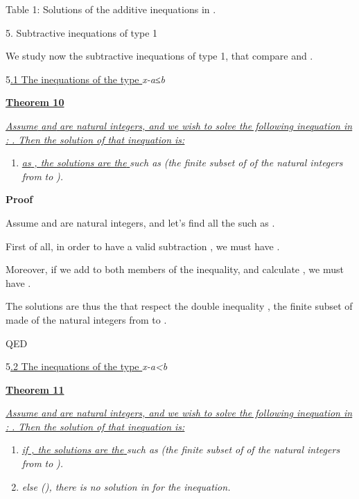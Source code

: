 \documentclass{article}
\providecommand{\tightlist}{%
  \setlength{\itemsep}{0pt}\setlength{\parskip}{0pt}}
\begin{document}
Table 1: Solutions of the additive inequations in .





5. Subtractive inequations of type 1

We study now the subtractive inequations of type 1, that compare  and .

5\ul{.1 The inequations of the type }\emph{x-a}\emph{≤}\emph{b}

\ul{\textbf{Theorem 10}}

\ul{\emph{Assume }}\ul{\emph{ and }}\ul{\emph{ are natural integers, and we wish to solve the following inequation in }}\ul{\emph{: }}\ul{\emph{. Then the solution of that inequation is:}}

\begin{enumerate}
\tightlist
\item \ul{\emph{as }}\ul{\emph{, the solutions are the }}\emph{ such as }\emph{ (the finite subset of }\emph{ of the natural integers from }\emph{ to }\emph{).}
\end{enumerate}

\textbf{Proof}

Assume  and  are natural integers, and let’s find all the  such as .

First of all, in order to have a valid subtraction , we must have .

Moreover, if we add  to both members of the inequality, and calculate , we must have .

The solutions are thus the  that respect the double inequality , the finite subset of  made of the natural integers from  to .

QED

5\ul{.2 The inequations of the type }\emph{x-a<b}

\ul{\textbf{Theorem 11}}

\ul{\emph{Assume }}\ul{\emph{ and }}\ul{\emph{ are natural integers, and we wish to solve the following inequation in }}\ul{\emph{: }}\ul{\emph{. Then the solution of that inequation is:}}

\begin{enumerate}
\tightlist
\item \ul{\emph{if }}\ul{\emph{, the solutions are the }}\emph{ such as }\emph{ (the finite subset of }\emph{ of the natural integers from }\emph{ to }\emph{).}
\item \emph{else (}\emph{), there is no solution in }\emph{ for the inequation.}
\end{enumerate}
\end{document}
